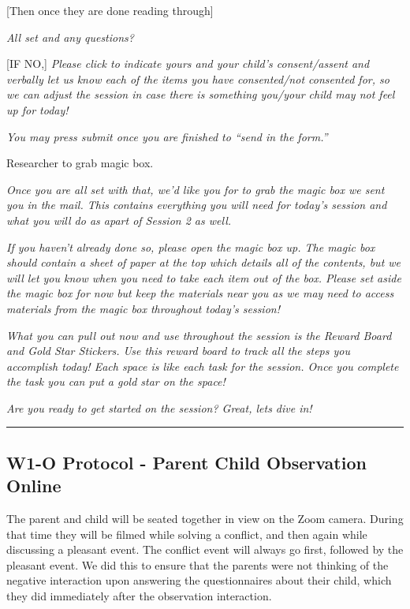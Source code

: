 \documentclass[]{book}
\begin{document}
{[}Then once they are done reading through{]}

\emph{All set and any questions?}

{[}IF NO,{]} \emph{Please click to indicate yours and your child's consent/assent and verbally let us know each of the items you have consented/not consented for, so we can adjust the session in case there is something you/your child may not feel up for today!}

\emph{You may press submit once you are finished to ``send in the form.''}

Researcher to grab magic box.

\emph{Once you are all set with that, we'd like you for to grab the magic box we sent you in the mail. This contains everything you will need for today's session and what you will do as apart of Session 2 as well.}

\emph{If you haven't already done so, please open the magic box up. The magic box should contain a sheet of paper at the top which details all of the contents, but we will let you know when you need to take each item out of the box. Please set aside the magic box for now but keep the materials near you as we may need to access materials from the magic box throughout today's session!}

\emph{What you can pull out now and use throughout the session is the Reward Board and Gold Star Stickers. Use this reward board to track all the steps you accomplish today! Each space is like each task for the session. Once you complete the task you can put a gold star on the space!}

\emph{Are you ready to get started on the session? Great, lets dive in!}

\begin{center}\rule{0.5\linewidth}{0.5pt}\end{center}

\hypertarget{w1-o-protocol---parent-child-observation-online}{%
\subsection{W1-O Protocol - Parent Child Observation Online}\label{w1-o-protocol---parent-child-observation-online}}

The parent and child will be seated together in view on the Zoom camera. During that time they will be filmed while solving a conflict, and then again while discussing a pleasant event. The conflict event will always go first, followed by the pleasant event. We did this to ensure that the parents were not thinking of the negative interaction upon answering the questionnaires about their child, which they did immediately after the observation interaction.
\end{document}
